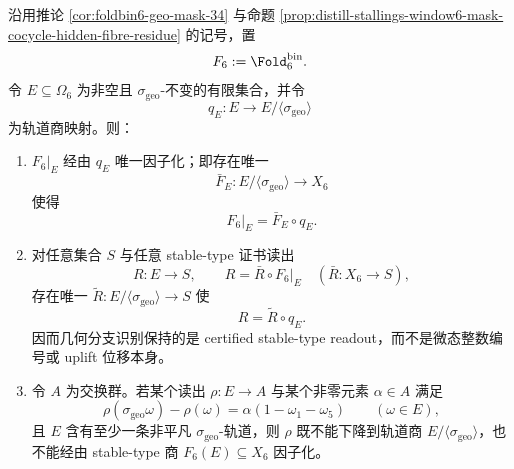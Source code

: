 \begin{proposition}
\label{distill:stallings_foldings_and_bestvina_handel_train_tracks-local_fold_preserves_represented_object-window6-geometric-branch-certified-readout}
沿用推论 \ref{cor:foldbin6-geo-mask-34} 与命题 \ref{prop:distill-stallings-window6-mask-cocycle-hidden-fibre-residue} 的记号，置
\[
F_6:=\Fold_6^{\mathrm{bin}}.
\]
令 \(E\subseteq\Omega_6\) 为非空且 \(\sigma_{\mathrm{geo}}\)-不变的有限集合，并令
\[
q_E:E\longrightarrow E/\langle\sigma_{\mathrm{geo}}\rangle
\]
为轨道商映射。则：
\begin{enumerate}
  \item \(F_6|_E\) 经由 \(q_E\) 唯一因子化；即存在唯一
  \[
  \bar F_E:E/\langle\sigma_{\mathrm{geo}}\rangle\longrightarrow X_6
  \]
  使得
  \[
  F_6|_E=\bar F_E\circ q_E.
  \]
  \item 对任意集合 \(S\) 与任意 stable-type 证书读出
  \[
  R:E\to S,
  \qquad
  R=\bar R\circ F_6|_E
  \quad(\bar R:X_6\to S),
  \]
  存在唯一 \(\widetilde R:E/\langle\sigma_{\mathrm{geo}}\rangle\to S\) 使
  \[
  R=\widetilde R\circ q_E.
  \]
  因而几何分支识别保持的是 certified stable-type readout，而不是微态整数编号或 uplift 位移本身。
  \item 令 \(A\) 为交换群。若某个读出 \(\rho:E\to A\) 与某个非零元素 \(\alpha\in A\) 满足
  \[
  \rho(\sigma_{\mathrm{geo}}\omega)-\rho(\omega)
  =\alpha(1-\omega_1-\omega_5)
  \qquad(\omega\in E),
  \]
  且 \(E\) 含有至少一条非平凡 \(\sigma_{\mathrm{geo}}\)-轨道，则 \(\rho\) 既不能下降到轨道商
  \(E/\langle\sigma_{\mathrm{geo}}\rangle\)，也不能经由 stable-type 商 \(F_6(E)\subseteq X_6\) 因子化。
\end{enumerate}
\end{proposition}
